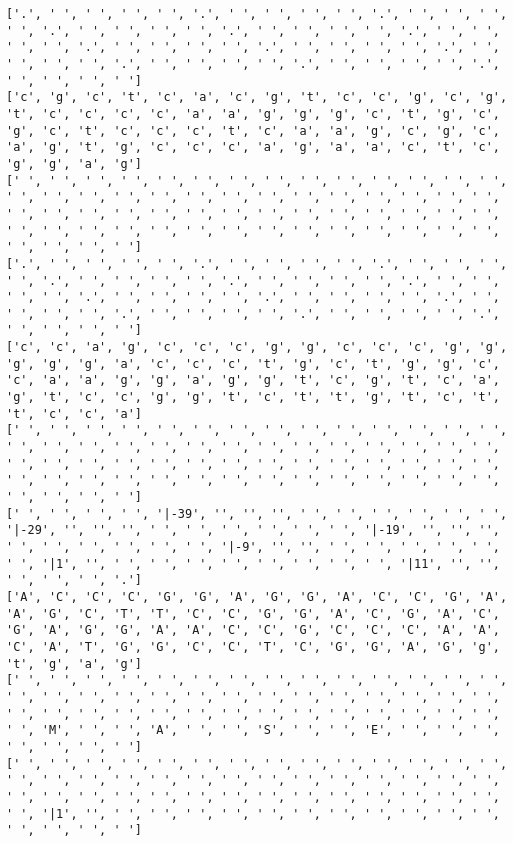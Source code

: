 \documentclass{article}
\begin{document}
\begin{Verbatim}
['.', ' ', ' ', ' ', ' ', '.', ' ', ' ', ' ', ' ', '.', ' ', ' ', ' ', ' ', '.', ' ', ' ', ' ', ' ', '.', ' ', ' ', ' ', ' ', '.', ' ', ' ', ' ', ' ', '.', ' ', ' ', ' ', ' ', '.', ' ', ' ', ' ', ' ', '.', ' ', ' ', ' ', ' ', '.', ' ', ' ', ' ', ' ', '.', ' ', ' ', ' ', ' ', '.', ' ', ' ', ' ', ' ']
['c', 'g', 'c', 't', 'c', 'a', 'c', 'g', 't', 'c', 'c', 'g', 'c', 'g', 't', 'c', 'c', 'c', 'c', 'a', 'a', 'g', 'g', 'g', 'c', 't', 'g', 'c', 'g', 'c', 't', 'c', 'c', 'c', 't', 'c', 'a', 'a', 'g', 'c', 'g', 'c', 'a', 'g', 't', 'g', 'c', 'c', 'c', 'a', 'g', 'a', 'a', 'c', 't', 'c', 'g', 'g', 'a', 'g']
[' ', ' ', ' ', ' ', ' ', ' ', ' ', ' ', ' ', ' ', ' ', ' ', ' ', ' ', ' ', ' ', ' ', ' ', ' ', ' ', ' ', ' ', ' ', ' ', ' ', ' ', ' ', ' ', ' ', ' ', ' ', ' ', ' ', ' ', ' ', ' ', ' ', ' ', ' ', ' ', ' ', ' ', ' ', ' ', ' ', ' ', ' ', ' ', ' ', ' ', ' ', ' ', ' ', ' ', ' ', ' ', ' ', ' ', ' ', ' ']
['.', ' ', ' ', ' ', ' ', '.', ' ', ' ', ' ', ' ', '.', ' ', ' ', ' ', ' ', '.', ' ', ' ', ' ', ' ', '.', ' ', ' ', ' ', ' ', '.', ' ', ' ', ' ', ' ', '.', ' ', ' ', ' ', ' ', '.', ' ', ' ', ' ', ' ', '.', ' ', ' ', ' ', ' ', '.', ' ', ' ', ' ', ' ', '.', ' ', ' ', ' ', ' ', '.', ' ', ' ', ' ', ' ']
['c', 'c', 'a', 'g', 'c', 'c', 'c', 'g', 'g', 'c', 'c', 'c', 'g', 'g', 'g', 'g', 'g', 'a', 'c', 'c', 'c', 't', 'g', 'c', 't', 'g', 'g', 'c', 'c', 'a', 'a', 'g', 'g', 'a', 'g', 'g', 't', 'c', 'g', 't', 'c', 'a', 'g', 't', 'c', 'c', 'g', 'g', 't', 'c', 't', 't', 'g', 't', 'c', 't', 't', 'c', 'c', 'a']
[' ', ' ', ' ', ' ', ' ', ' ', ' ', ' ', ' ', ' ', ' ', ' ', ' ', ' ', ' ', ' ', ' ', ' ', ' ', ' ', ' ', ' ', ' ', ' ', ' ', ' ', ' ', ' ', ' ', ' ', ' ', ' ', ' ', ' ', ' ', ' ', ' ', ' ', ' ', ' ', ' ', ' ', ' ', ' ', ' ', ' ', ' ', ' ', ' ', ' ', ' ', ' ', ' ', ' ', ' ', ' ', ' ', ' ', ' ', ' ']
[' ', ' ', ' ', ' ', '|-39', '', '', '', ' ', ' ', ' ', ' ', ' ', ' ', '|-29', '', '', '', ' ', ' ', ' ', ' ', ' ', ' ', '|-19', '', '', '', ' ', ' ', ' ', ' ', ' ', ' ', '|-9', '', '', ' ', ' ', ' ', ' ', ' ', ' ', '|1', '', ' ', ' ', ' ', ' ', ' ', ' ', ' ', ' ', '|11', '', '', ' ', ' ', ' ', '.']
['A', 'C', 'C', 'C', 'G', 'G', 'A', 'G', 'G', 'A', 'C', 'C', 'G', 'A', 'A', 'G', 'C', 'T', 'T', 'C', 'C', 'G', 'G', 'A', 'C', 'G', 'A', 'C', 'G', 'A', 'G', 'G', 'A', 'A', 'C', 'C', 'G', 'C', 'C', 'C', 'A', 'A', 'C', 'A', 'T', 'G', 'G', 'C', 'C', 'T', 'C', 'G', 'G', 'A', 'G', 'g', 't', 'g', 'a', 'g']
[' ', ' ', ' ', ' ', ' ', ' ', ' ', ' ', ' ', ' ', ' ', ' ', ' ', ' ', ' ', ' ', ' ', ' ', ' ', ' ', ' ', ' ', ' ', ' ', ' ', ' ', ' ', ' ', ' ', ' ', ' ', ' ', ' ', ' ', ' ', ' ', ' ', ' ', ' ', ' ', ' ', ' ', ' ', 'M', ' ', ' ', 'A', ' ', ' ', 'S', ' ', ' ', 'E', ' ', ' ', ' ', ' ', ' ', ' ', ' ']
[' ', ' ', ' ', ' ', ' ', ' ', ' ', ' ', ' ', ' ', ' ', ' ', ' ', ' ', ' ', ' ', ' ', ' ', ' ', ' ', ' ', ' ', ' ', ' ', ' ', ' ', ' ', ' ', ' ', ' ', ' ', ' ', ' ', ' ', ' ', ' ', ' ', ' ', ' ', ' ', ' ', ' ', ' ', '|1', '', ' ', ' ', ' ', ' ', ' ', ' ', ' ', ' ', ' ', ' ', ' ', ' ', ' ', ' ', ' ']
  

\end{Verbatim}
\end{document}
